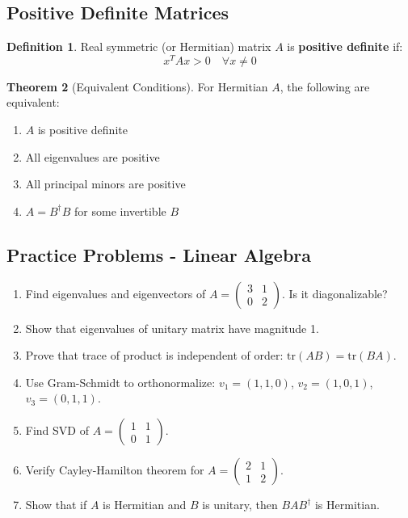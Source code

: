 \documentclass[12pt,a4paper]{article}
\theoremstyle{definition}
\newtheorem{theorem}{Theorem}[section]
\newtheorem{definition}[theorem]{Definition}
\begin{document}
\subsection{Positive Definite Matrices}

\begin{definition}
Real symmetric (or Hermitian) matrix $A$ is \textbf{positive definite} if:
\[
x^TAx > 0 \quad \forall x \neq 0
\]
\end{definition}

\begin{theorem}[Equivalent Conditions]
For Hermitian $A$, the following are equivalent:
\begin{enumerate}
    \item $A$ is positive definite
    \item All eigenvalues are positive
    \item All principal minors are positive
    \item $A = B^\dagger B$ for some invertible $B$
\end{enumerate}
\end{theorem}

\subsection{Practice Problems - Linear Algebra}

\begin{enumerate}
    \item Find eigenvalues and eigenvectors of $A = \begin{pmatrix}3 & 1 \\ 0 & 2\end{pmatrix}$. Is it diagonalizable?
    
    \item Show that eigenvalues of unitary matrix have magnitude 1.
    
    \item Prove that trace of product is independent of order: $\text{tr}(AB) = \text{tr}(BA)$.
    
    \item Use Gram-Schmidt to orthonormalize: $v_1 = (1,1,0)$, $v_2 = (1,0,1)$, $v_3 = (0,1,1)$.
    
    \item Find SVD of $A = \begin{pmatrix}1 & 1 \\ 0 & 1\end{pmatrix}$.
    
    \item Verify Cayley-Hamilton theorem for $A = \begin{pmatrix}2 & 1 \\ 1 & 2\end{pmatrix}$.
    
    \item Show that if $A$ is Hermitian and $B$ is unitary, then $BAB^\dagger$ is Hermitian.
\end{enumerate}
\end{document}
